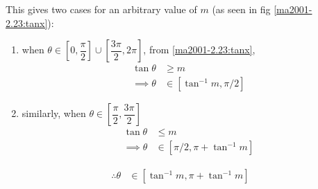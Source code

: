 This gives two cases for an arbitrary value of $m$ (as seen in fig \ref{ma2001-2.23:tanx}):
\begin{enumerate}
    \item when $\theta\in \left[0,\dfrac{\pi}{2}\right]\cup\left[\dfrac{3\pi}{2},2\pi\right]$, from \ref{ma2001-2.23:tanx},
    \begin{align}
        \tan\theta&\geq m\\
        \implies \theta &\in [\tan^{-1}m, \pi/2]
    \end{align}
    \item similarly, when $\theta \in \left[\dfrac{\pi}{2}, \dfrac{3\pi}{2}\right]$
    \begin{align}
        \tan\theta&\leq m\\
        \implies \theta &\in [\pi/2, \pi+\tan^{-1}m]
    \end{align}
\end{enumerate}
\begin{align}
    \therefore \theta &\in [\tan^{-1} m, \pi+\tan^{-1} m]
\end{align}

